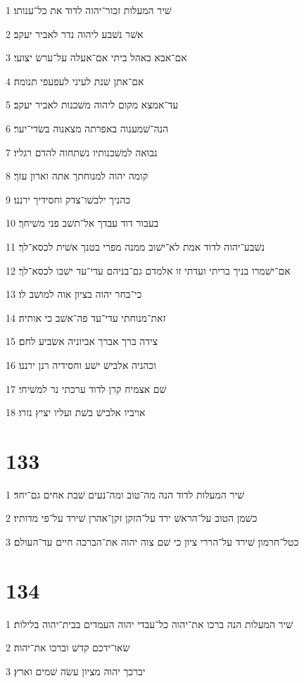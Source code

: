 \par 1 שׁיר המעלות זכור־יהוה לדוד את כל־ענותו׃
\par 2 אשׁר נשׁבע ליהוה נדר לאביר יעקב׃
\par 3 אם־אבא באהל ביתי אם־אעלה על־ערשׂ יצועי׃
\par 4 אם־אתן שׁנת לעיני לעפעפי תנומה׃
\par 5 עד־אמצא מקום ליהוה משׁכנות לאביר יעקב׃
\par 6 הנה־שׁמענוה באפרתה מצאנוה בשׂדי־יער׃
\par 7 נבואה למשׁכנותיו נשׁתחוה להדם רגליו׃
\par 8 קומה יהוה למנוחתך אתה וארון עזך׃
\par 9 כהניך ילבשׁו־צדק וחסידיך ירננו׃
\par 10 בעבור דוד עבדך אל־תשׁב פני משׁיחך׃
\par 11 נשׁבע־יהוה לדוד אמת לא־ישׁוב ממנה מפרי בטנך אשׁית לכסא־לך׃
\par 12 אם־ישׁמרו בניך בריתי ועדתי זו אלמדם גם־בניהם עדי־עד ישׁבו לכסא־לך׃
\par 13 כי־בחר יהוה בציון אוה למושׁב לו׃
\par 14 זאת־מנוחתי עדי־עד פה־אשׁב כי אותיה׃
\par 15 צידה ברך אברך אביוניה אשׂביע לחם׃
\par 16 וכהניה אלבישׁ ישׁע וחסידיה רנן ירננו׃
\par 17 שׁם אצמיח קרן לדוד ערכתי נר למשׁיחי׃
\par 18 אויביו אלבישׁ בשׁת ועליו יציץ נזרו׃

\chapter{133}

\par 1 שׁיר המעלות לדוד הנה מה־טוב ומה־נעים שׁבת אחים גם־יחד׃
\par 2 כשׁמן הטוב על־הראשׁ ירד על־הזקן זקן־אהרן שׁירד על־פי מדותיו׃
\par 3 כטל־חרמון שׁירד על־הררי ציון כי שׁם צוה יהוה את־הברכה חיים עד־העולם׃

\chapter{134}

\par 1 שׁיר המעלות הנה ברכו את־יהוה כל־עבדי יהוה העמדים בבית־יהוה בלילות׃
\par 2 שׂאו־ידכם קדשׁ וברכו את־יהוה׃
\par 3 יברכך יהוה מציון עשׂה שׁמים וארץ׃

